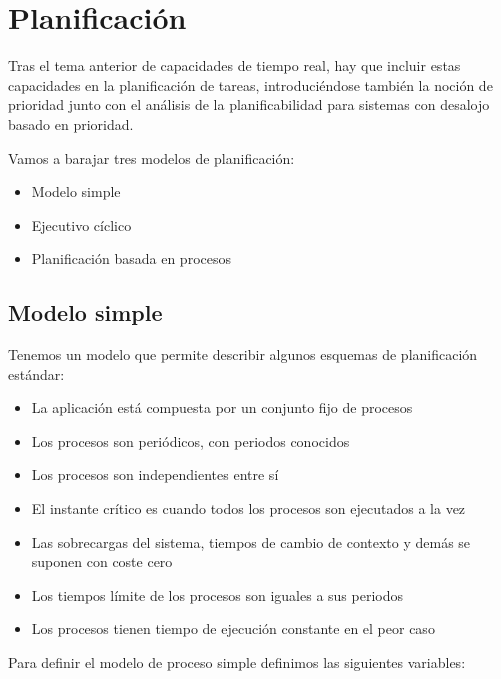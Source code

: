 \section{Planificación}

Tras el tema anterior de capacidades de tiempo real, hay que incluir estas
capacidades en la planificación de tareas, introduciéndose también la noción de
prioridad junto con el análisis de la planificabilidad para sistemas con
desalojo basado en prioridad.

Vamos a barajar tres modelos de planificación:

\begin{itemize}
	\item Modelo simple
	\item Ejecutivo cíclico
	\item Planificación basada en procesos
\end{itemize}

\subsection{Modelo simple}

Tenemos un modelo que permite describir algunos esquemas de planificación
estándar:

\begin{itemize}
	\item La aplicación está compuesta por un conjunto fijo de procesos
	\item Los procesos son periódicos, con periodos conocidos
	\item Los procesos son independientes entre sí
	\item El instante crítico es cuando todos los procesos son ejecutados a
		la vez
	\item Las sobrecargas del sistema, tiempos de cambio de contexto y demás
		se suponen con coste cero
	\item Los tiempos límite de los procesos son iguales a sus periodos
	\item Los procesos tienen tiempo de ejecución constante en el peor caso
\end{itemize}

Para definir el modelo de proceso simple definimos las siguientes variables:

